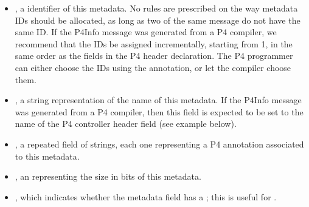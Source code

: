 \documentclass[11pt]{article}
\begin{document}
{\begin{itemize}
\begin{itemize}[noitemsep,topsep=\mdcompacttopsep]%

\item{}, a  identifier of this metadata. No rules are prescribed on
the way metadata IDs should be allocated, as long as two  of the
same  message do not have the same ID. If the
P4Info message was generated from a P4 compiler, we recommend that the IDs
be assigned incrementally, starting from 1, in the same order as the
fields in the P4 header declaration. The P4 programmer can either choose
the IDs using the  annotation, or let the compiler choose them.%

\item{}, a string representation of the name of this metadata. If the
P4Info message was generated from a P4 compiler, then this field is
expected to be set to the name of the P4 controller header field (see
example below).%

\item{}, a repeated field of strings, each one representing a P4
annotation associated to this metadata.%

\item{}, an  representing the size in bits of this metadata.%

\item{}, which indicates whether the metadata field has a
; this is useful for
.%
\end{itemize}%
\end{itemize}%

}
\end{document}
